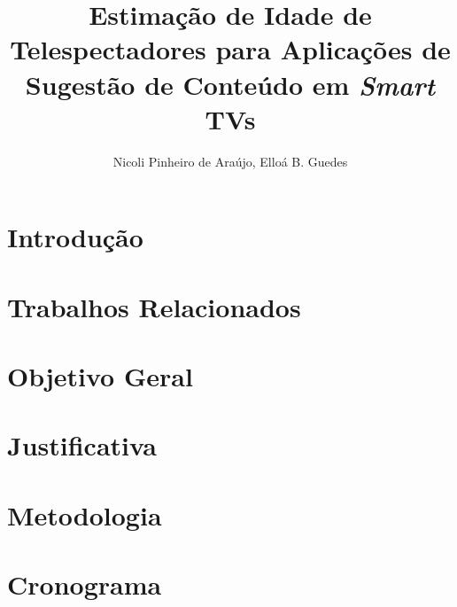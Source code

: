 \documentclass[12pt]{article}
\title{Estimação de Idade de Telespectadores para Aplicações de Sugestão de Conteúdo em \emph{Smart} TVs}
\author{Nicoli Pinheiro de Araújo, Elloá B. Guedes}
\begin{document}

\maketitle



\section{Introdução}\label{sec:intro}


\section{Trabalhos Relacionados}\label{sec:trab_relac}


\section{Objetivo Geral}\label{sec:objetivo}


\section{Justificativa}\label{sec:justificativa}


\section{Metodologia}\label{sec:metodo}


\section{Cronograma}\label{sec:crono}



\end{document}
